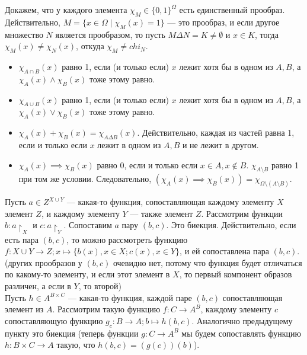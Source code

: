 \documentclass[12pt,a4paper]{article}
\begin{document}
\setcounter{probs}{5}

\n Докажем, что у каждого элемента $\chi_M\in {\{0,1\}}^\Omega$ есть единственный прообраз. Действительно, $M=\{x\in\Omega\mid \chi_M(x)=1\}$ --- это прообраз, и если другое множество $N$ является прообразом, то пусть $M\Delta N=K\neq\emptyset$ и $x\in K$, тогда $\chi_M(x)\neq \chi_N(x)$, откуда $\chi_M\neq chi_N$.\QEDA\\

\p

\begin{itemize}
	\item $\chi_{A\cap B}(x)$ равно 1, если (и только если) $x$ лежит хотя бы в одном из $A,B$, а $\chi_A(x)\land\chi_B(x)$ тоже этому равно.
	\item $\chi_{A\cup B}(x)$ равно 1, если (и только если) $x$ лежит хотя бы в одном из $A,B$, а $\chi_A(x)\lor\chi_B(x)$ тоже этому равно.
	\item $\chi_A(x)+\chi_B(x)=\chi_{A\Delta B}(x)$. Действительно, каждая из частей равна 1, если и только если $x$ лежит в одном из $A,B$ и не лежит в другом.
	\item $\chi_A(x)\implies \chi_B(x)$ равно 0, если и только если $x\in A,x\not\in B$. $\chi_{A\setminus B}$ равно 1 при том же условии. Следовательно, $(\chi_A(x)\implies\chi_B(x))=\chi_{\Omega\setminus(A\setminus B)}$.
\end{itemize}

\newpage

\n Пусть $a\in Z^{X\cup Y}$ --- какая-то функция, сопоставляющая каждому элементу $X$ элемент $Z$, и каждому элементу $Y$ --- также элемент $Z$. Рассмотрим функции $b:a\restriction_X$ и $c:a\restriction_Y$. Сопоставим $a$ пару $(b,c)$. Это биекция. Действительно, если есть пара $(b,c)$, то можно рассмотреть функцию $f:X\cup Y\to Z;x\mapsto \{b(x), x\in X;c(x), x\in Y\}$, и ей сопоставлена пара $(b,c)$. (других прообразов у $(b,c)$ очевидно нет, потому что функция будет отличаться по какому-то элементу, и если этот элемент в $X$, то первый компонент образов различен, а если в $Y$, то второй)\QEDA\\

\p Пусть $h\in A^{B\times C}$ --- какая-то функция, каждой паре $(b,c)$ сопоставляющая элемент из $A$. Рассмотрим такую функцию $f:C\to A^B$, каждому элементу $c$ сопоставляющую функцию $g_c:B\to A;b\mapsto h(b,c)$. Аналогично предыдущему пункту это биекция (теперь функции $g:C\to A^B$ мы будем сопоставлять функцию $h:B\times C\to A$ такую, что $h(b,c)=(g(c))(b)$).\QEDA\\
\end{document}
